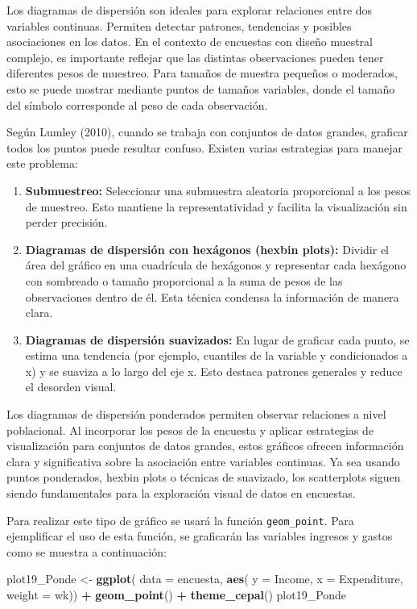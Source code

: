 \documentclass[
  spanish,
  12pt,
]{book}
\newenvironment{Shaded}{\begin{snugshade}}{\end{snugshade}}
\newcommand{\AttributeTok}[1]{\textcolor[rgb]{0.13,0.29,0.53}{#1}}
\newcommand{\FunctionTok}[1]{\textcolor[rgb]{0.13,0.29,0.53}{\textbf{#1}}}
\newcommand{\NormalTok}[1]{#1}
\newcommand{\OtherTok}[1]{\textcolor[rgb]{0.56,0.35,0.01}{#1}}
\newcommand{\SpecialCharTok}[1]{\textcolor[rgb]{0.81,0.36,0.00}{\textbf{#1}}}
\begin{document}
Los diagramas de dispersión son ideales para explorar relaciones entre dos variables continuas. Permiten detectar patrones, tendencias y posibles asociaciones en los datos. En el contexto de encuestas con diseño muestral complejo, es importante reflejar que las distintas observaciones pueden tener diferentes pesos de muestreo. Para tamaños de muestra pequeños o moderados, esto se puede mostrar mediante puntos de tamaños variables, donde el tamaño del símbolo corresponde al peso de cada observación.

Según Lumley (2010), cuando se trabaja con conjuntos de datos grandes, graficar todos los puntos puede resultar confuso. Existen varias estrategias para manejar este problema:

\begin{enumerate}
\def\labelenumi{\arabic{enumi}.}
\item
  \textbf{Submuestreo:} Seleccionar una submuestra aleatoria proporcional a los pesos de muestreo. Esto mantiene la representatividad y facilita la visualización sin perder precisión.
\item
  \textbf{Diagramas de dispersión con hexágonos (hexbin plots):} Dividir el área del gráfico en una cuadrícula de hexágonos y representar cada hexágono con sombreado o tamaño proporcional a la suma de pesos de las observaciones dentro de él. Esta técnica condensa la información de manera clara.
\item
  \textbf{Diagramas de dispersión suavizados:} En lugar de graficar cada punto, se estima una tendencia (por ejemplo, cuantiles de la variable y condicionados a x) y se suaviza a lo largo del eje x. Esto destaca patrones generales y reduce el desorden visual.
\end{enumerate}

Los diagramas de dispersión ponderados permiten observar relaciones a nivel poblacional. Al incorporar los pesos de la encuesta y aplicar estrategias de visualización para conjuntos de datos grandes, estos gráficos ofrecen información clara y significativa sobre la asociación entre variables continuas. Ya sea usando puntos ponderados, hexbin plots o técnicas de suavizado, los scatterplots siguen siendo fundamentales para la exploración visual de datos en encuestas.

Para realizar este tipo de gráfico se usará la función \texttt{geom\_point}. Para ejemplificar el uso de esta función, se graficarán las variables ingresos y gastos como se muestra a continuación:

\begin{Shaded}
\begin{Highlighting}[]
\NormalTok{plot19\_Ponde }\OtherTok{\textless{}{-}} \FunctionTok{ggplot}\NormalTok{( }
  \AttributeTok{data =}\NormalTok{ encuesta,}
      \FunctionTok{aes}\NormalTok{(}
      \AttributeTok{y =}\NormalTok{ Income,}
      \AttributeTok{x =}\NormalTok{ Expenditure,}
      \AttributeTok{weight =}\NormalTok{ wk)) }\SpecialCharTok{+}
  \FunctionTok{geom\_point}\NormalTok{() }\SpecialCharTok{+}
  \FunctionTok{theme\_cepal}\NormalTok{()}
\NormalTok{plot19\_Ponde}
\end{Highlighting}
\end{Shaded}
\end{document}
